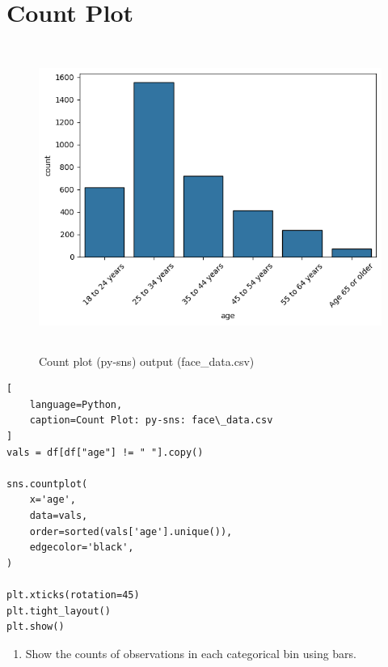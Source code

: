 \section{Count Plot \cite{data/online/seaborn.countplot}} \label{Visualizing Data/Count Plot}


\begin{table}[H]
\begin{minipage}[t]{0.35\linewidth}
\begin{figure}[H]
    \centering
    \includegraphics[width=0.9\linewidth, height=10cm, keepaspectratio]{images/data/__visualizations__/sns-countplot-face-data.png}
    \caption{Count plot (py-sns) output (face\_data.csv)}
\end{figure}
\end{minipage}
\hspace{0.2cm}
\vrule width 1pt
\hspace{0.5cm}
\begin{minipage}[t]{0.57\linewidth}
\begin{lstlisting}[
    language=Python,
    caption=Count Plot: py-sns: face\_data.csv
]
vals = df[df["age"] != " "].copy()

sns.countplot(
    x='age',
    data=vals,
    order=sorted(vals['age'].unique()),
    edgecolor='black',
)

plt.xticks(rotation=45)
plt.tight_layout()
plt.show()
\end{lstlisting}
\end{minipage}
\end{table}

\vspace{0.3cm}

\begin{enumerate}
    \item Show the counts of observations in each categorical bin using bars.


\end{enumerate}

